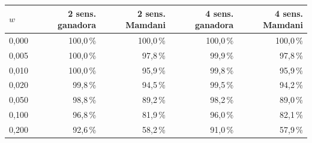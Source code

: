 \begin{tabular}{lrrrr}
\toprule
$w$ & 2 sens. ganadora & 2 sens. Mamdani & 4 sens. ganadora & 4 sens. Mamdani \\
\midrule
0,000 & 100,0\,\% & 100,0\,\% & 100,0\,\% & 100,0\,\% \\
0,005 & 100,0\,\% & 97,8\,\% & 99,9\,\% & 97,8\,\% \\
0,010 & 100,0\,\% & 95,9\,\% & 99,8\,\% & 95,9\,\% \\
0,020 & 99,8\,\% & 94,5\,\% & 99,5\,\% & 94,2\,\% \\
0,050 & 98,8\,\% & 89,2\,\% & 98,2\,\% & 89,0\,\% \\
0,100 & 96,8\,\% & 81,9\,\% & 96,0\,\% & 82,1\,\% \\
0,200 & 92,6\,\% & 58,2\,\% & 91,0\,\% & 57,9\,\% \\
\bottomrule
\end{tabular}
